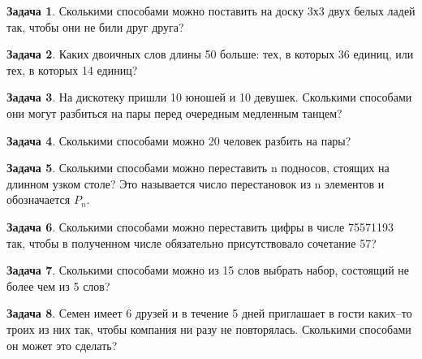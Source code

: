 \documentclass[a4paper,11pt]{article}%
\theoremstyle{definition}%
\newtheorem{Ex}{\hspace{-25pt}\fbox{\phantom{123}} Задача}%
\begin{document}
%
\iffalse%
Автор: Ираклий Гагуа%
Дата: 2011%
Название: %
Подсказка: \textbackslash{}\textbackslash{}%
nan%
\fi%
%
\begin{Ex}%
Сколькими способами можно поставить на доску 3х3 двух белых ладей так, чтобы они не били друг друга?%
%
\end{Ex}%
%
\iffalse%
Автор: Ираклий Гагуа%
Дата: 2011%
Название: %
Подсказка: \textbackslash{}\textbackslash{}%
nan%
\fi%
%
\begin{Ex}%
Каких двоичных слов длины 50 больше: тех, в которых 36 единиц, или тех, в которых 14 единиц?%
%
\end{Ex}%
%
\iffalse%
Автор: Ираклий Гагуа%
Дата: 2011%
Название: %
Подсказка: \textbackslash{}\textbackslash{}%
nan%
\fi%
%
\begin{Ex}%
На дискотеку пришли 10 юношей и 10 девушек. Сколькими способами они могут разбиться на пары перед очередным медленным танцем?%
%
\end{Ex}%
%
\iffalse%
Автор: 25 школа%
Дата: 2017%
Название: %
Подсказка: \textbackslash{}\textbackslash{}%
nan%
\fi%
%
\begin{Ex}%
Сколькими способами можно 20 человек разбить на пары?%
%
\end{Ex}%
%
\iffalse%
Автор: 25 школа%
Дата: 2017%
Название: %
Подсказка: \textbackslash{}\textbackslash{}%
nan%
\fi%
%
\begin{Ex}%
Сколькими способами можно переставить n подносов, стоящих на длинном узком столе? Это называется число перестановок из n элементов и обозначается $P_n$.%
%
\end{Ex}%
%
\iffalse%
Автор: Ираклий Гагуа%
Дата: 2011%
Название: %
Подсказка: \textbackslash{}\textbackslash{}%
nan%
\fi%
%
\begin{Ex}%
Сколькими способами можно переставить цифры в числе 75571193 так, чтобы в полученном
числе обязательно присутствовало сочетание 57?%
%
\end{Ex}%
%
\iffalse%
Автор: Павел Живцов%
Дата: 2018%
Название: %
Подсказка: \textbackslash{}\textbackslash{}%
nan%
\fi%
%
\begin{Ex}%
Сколькими способами можно из 15 слов выбрать набор, состоящий не более чем
из 5 слов?%
%
\end{Ex}%
%
\iffalse%
Автор: 25 школа%
Дата: 2017%
Название: %
Подсказка: \textbackslash{}\textbackslash{}%
nan%
\fi%
%
\begin{Ex}%
Семен имеет 6 друзей и в течение 5 дней приглашает в гости каких–то троих
из них так, чтобы компания ни разу не повторялась. Сколькими способами он может
это сделать?%
%
\end{Ex}%
\end{document}
